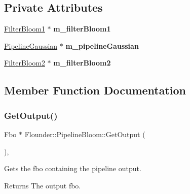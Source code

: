 \subsection*{Private Attributes}
\begin{DoxyCompactItemize}
\item 
\mbox{\label{class_flounder_1_1_pipeline_bloom_a26760247d1ad943d249cbbb08c31e596}} 
\hyperlink{class_flounder_1_1_filter_bloom1}{Filter\+Bloom1} $\ast$ {\bfseries m\+\_\+filter\+Bloom1}
\item 
\mbox{\label{class_flounder_1_1_pipeline_bloom_a2243039a798bcf0d1f71f3096e0a6627}} 
\hyperlink{class_flounder_1_1_pipeline_gaussian}{Pipeline\+Gaussian} $\ast$ {\bfseries m\+\_\+pipeline\+Gaussian}
\item 
\mbox{\label{class_flounder_1_1_pipeline_bloom_a4e7bfe4eb263b1fb43004986bbb47aca}} 
\hyperlink{class_flounder_1_1_filter_bloom2}{Filter\+Bloom2} $\ast$ {\bfseries m\+\_\+filter\+Bloom2}
\end{DoxyCompactItemize}


\subsection{Member Function Documentation}
\mbox{\label{class_flounder_1_1_pipeline_bloom_af1ee24a22c9c28e3f9a66df542a943ee}} 
\subsubsection{\texorpdfstring{Get\+Output()}{GetOutput()}}
{\footnotesize\ttfamily Fbo $\ast$ Flounder\+::\+Pipeline\+Bloom\+::\+Get\+Output (\begin{DoxyParamCaption}{ }\end{DoxyParamCaption})\hspace{0.3cm}{\ttfamily [override]}, {\ttfamily [virtual]}}



Gets the fbo containing the pipeline output. 

\begin{DoxyReturn}{Returns}
The output fbo. 
\end{DoxyReturn}


